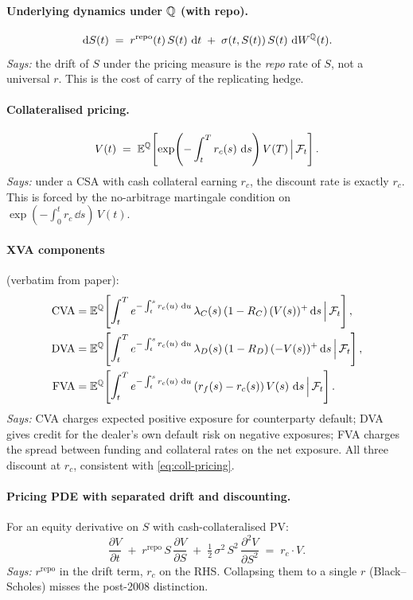 \documentclass[11pt,a4paper]{article}
\begin{document}
\paragraph{Underlying dynamics under $\mathbb{Q}$ (with repo).}
\begin{equation}\label{eq:underlying-dyn}
  \,\mathrm{d} S(t) \;=\; r^{\text{repo}}(t)\,S(t)\,\,\mathrm{d} t \;+\; \sigma(t, S(t))\, S(t)\, \,\mathrm{d} W^{\mathbb{Q}}(t).
\end{equation}
\textit{Says:} the drift of $S$ under the pricing measure is the
\emph{repo} rate of $S$, not a universal $r$. This is the cost of
carry of the replicating hedge.

\paragraph{Collateralised pricing.}
\begin{equation}\label{eq:coll-pricing}
  V(t) \;=\; \mathbb{E}^{\mathbb{Q}}\!\left[ \exp\!\left(-\int_t^T r_c(s)\,\,\mathrm{d} s\right) V(T) \,\Big|\, \mathcal{F}_{t} \right].
\end{equation}
\textit{Says:} under a CSA with cash collateral earning $r_c$, the
discount rate is exactly $r_c$. This is forced by the no-arbitrage
martingale condition on $\exp(-\int_0^t r_c\,\dd s)\, V(t)$.

\paragraph{XVA components} (verbatim from paper):
\begin{align}
  \text{CVA} &= \mathbb{E}^{\mathbb{Q}}\!\left[\int_t^T e^{-\int_t^s r_c(u)\,\,\mathrm{d} u}\,\lambda_C(s)\,(1-R_C)\,(V(s))^+ \,\mathrm{d} s\,\Big|\,\mathcal{F}_{t}\right], \label{eq:cva}\\
  \text{DVA} &= \mathbb{E}^{\mathbb{Q}}\!\left[\int_t^T e^{-\int_t^s r_c(u)\,\,\mathrm{d} u}\,\lambda_D(s)\,(1-R_D)\,(-V(s))^+ \,\mathrm{d} s\,\Big|\,\mathcal{F}_{t}\right], \label{eq:dva}\\
  \text{FVA} &= \mathbb{E}^{\mathbb{Q}}\!\left[\int_t^T e^{-\int_t^s r_c(u)\,\,\mathrm{d} u}\,(r_f(s) - r_c(s))\, V(s)\,\,\mathrm{d} s\,\Big|\,\mathcal{F}_{t}\right]. \label{eq:fva}
\end{align}
\textit{Says:} CVA charges expected positive exposure for counterparty
default; DVA gives credit for the dealer's own default risk on negative
exposures; FVA charges the spread between funding and collateral rates
on the net exposure. All three discount at $r_c$, consistent with
\eqref{eq:coll-pricing}.

\paragraph{Pricing PDE with separated drift and discounting.}
For an equity derivative on $S$ with cash-collateralised PV:
\begin{equation}\label{eq:pde-split}
  \frac{\partial V}{\partial t}
  \;+\; r^{\text{repo}}\, S\, \frac{\partial V}{\partial S}
  \;+\; \tfrac{1}{2}\,\sigma^2\, S^2\, \frac{\partial^2 V}{\partial S^2}
  \;=\; r_c \cdot V.
\end{equation}
\textit{Says:} $r^{\text{repo}}$ in the drift term, $r_c$ on the RHS.
Collapsing them to a single $r$ (Black--Scholes) misses the post-2008
distinction.
\end{document}
